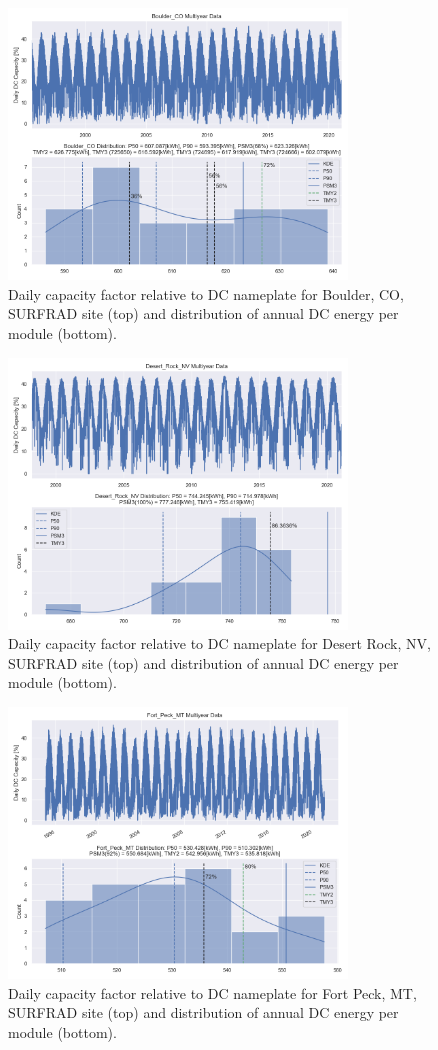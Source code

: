 \documentclass[conference]{IEEEtran}
\begin{document}
\begin{figure}[htbp]
\centerline{\includegraphics[width=9cm]{Boulder_CO.png}}
\caption{Daily capacity factor relative to DC nameplate for Boulder, CO, SURFRAD site (top) and distribution of annual DC energy per module (bottom).}
\label{fig:Boulder-CO}
\end{figure}

\begin{figure}[htbp]
\centerline{\includegraphics[width=9cm]{Desert_Rock_NV}}
\caption{Daily capacity factor relative to DC nameplate for Desert Rock, NV, SURFRAD site (top) and distribution of annual DC energy per module (bottom).}
\label{fig:Desert-Rock-NV}
\end{figure}

\begin{figure}[htbp]
\centerline{\includegraphics[width=9cm]{Fort_Peck_MT.png}}
\caption{Daily capacity factor relative to DC nameplate for Fort Peck, MT, SURFRAD site (top) and distribution of annual DC energy per module (bottom).}
\label{fig:Fort-Peck-MT}
\end{figure}
\end{document}
